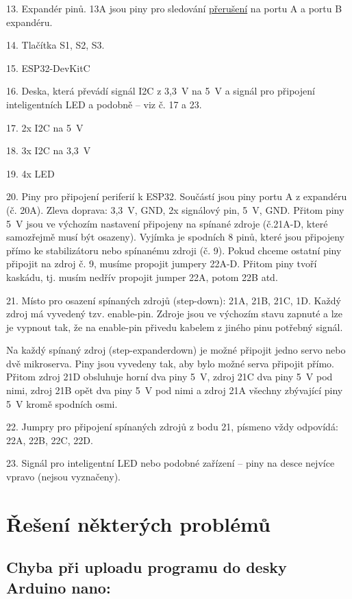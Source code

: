 13. Expandér pinů.
13A jsou piny pro sledování  \hyperref[preruseni]{přerušení}  na portu A a portu B expandéru. 

14. Tlačítka S1, S2, S3. 

15. ESP32-DevKitC

16. Deska, která převádí signál I2C z 3,3~V na 5~V a signál pro připojení inteligentních LED a podobně -- viz č. 17 a 23.

17. 2x I2C na 5~V

18. 3x I2C na 3,3~V

19. 4x LED 

20. Piny pro připojení periferií k ESP32. 
Součástí jsou piny portu A z expandéru (č. 20A). 
Zleva doprava: 3,3~V, GND, 2x signálový pin, 5~V, GND. 
Přitom piny 5~V jsou ve výchozím nastavení připojeny na spínané zdroje (č.21A-D, které samozřejmě musí být osazeny). 
Vyjímka je spodních 8 pinů, které jsou připojeny přímo ke stabilizátoru nebo spínanému zdroji (č. 9). 
Pokud chceme ostatní piny připojit na zdroj č. 9, musíme propojit jumpery 22A-D. 
Přitom piny tvoří kaskádu, tj. musím nedřív propojit jumper 22A, potom 22B atd. 

21. Místo pro osazení spínaných zdrojů (step-down): 21A, 21B, 21C, 1D. 
Každý zdroj má vyvedený tzv. enable-pin. 
Zdroje jsou ve výchozím stavu zapnuté a lze je  vypnout tak, že na enable-pin přivedu kabelem z jiného pinu potřebný signál. 

Na každý spínaný zdroj (step-expanderdown) je možné připojit jedno servo nebo dvě mikroserva. 
Piny jsou vyvedeny tak, aby bylo možné serva připojit přímo. 
Přitom zdroj 21D obsluhuje horní dva piny 5~V, zdroj 21C dva piny 5~V pod nimi, zdroj 21B opět dva piny 5~V pod nimi a zdroj 21A všechny zbývající piny 5~V kromě spodních osmi.


22. Jumpry pro připojení spínaných zdrojů z bodu 21, písmeno vždy odpovídá: 22A, 22B, 22C, 22D.

23. Signál pro inteligentní LED nebo podobné zařízení -- piny na desce nejvíce vpravo (nejsou vyznačeny).

\section{Řešení některých problémů}

\subsection{Chyba při uploadu programu do desky Arduino nano:}
 
